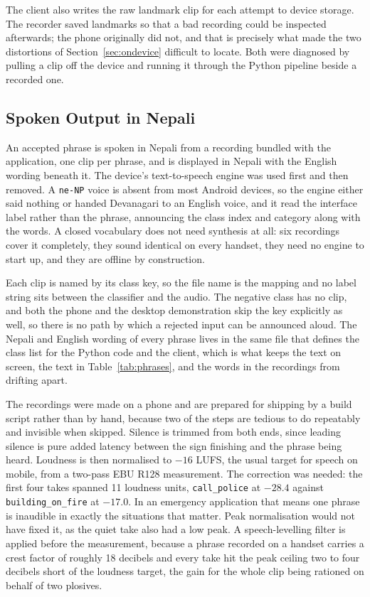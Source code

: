 The client also writes the raw landmark clip for each attempt to device storage. The recorder saved landmarks so that a bad recording could be inspected afterwards; the phone originally did not, and that is precisely what made the two distortions of Section~\ref{sec:ondevice} difficult to locate. Both were diagnosed by pulling a clip off the device and running it through the Python pipeline beside a recorded one.

\subsection{Spoken Output in Nepali}
\label{sec:audio}

An accepted phrase is spoken in Nepali from a recording bundled with the application, one clip per phrase, and is displayed in Nepali with the English wording beneath it. The device's text-to-speech engine was used first and then removed. A \texttt{ne-NP} voice is absent from most Android devices, so the engine either said nothing or handed Devanagari to an English voice, and it read the interface label rather than the phrase, announcing the class index and category along with the words. A closed vocabulary does not need synthesis at all: six recordings cover it completely, they sound identical on every handset, they need no engine to start up, and they are offline by construction.

Each clip is named by its class key, so the file name is the mapping and no label string sits between the classifier and the audio. The negative class has no clip, and both the phone and the desktop demonstration skip the key explicitly as well, so there is no path by which a rejected input can be announced aloud. The Nepali and English wording of every phrase lives in the same file that defines the class list for the Python code and the client, which is what keeps the text on screen, the text in Table~\ref{tab:phrases}, and the words in the recordings from drifting apart.

The recordings were made on a phone and are prepared for shipping by a build script rather than by hand, because two of the steps are tedious to do repeatably and invisible when skipped. Silence is trimmed from both ends, since leading silence is pure added latency between the sign finishing and the phrase being heard. Loudness is then normalised to $-16$ LUFS, the usual target for speech on mobile, from a two-pass EBU R128 measurement. The correction was needed: the first four takes spanned 11 loudness units, \texttt{call\_police} at $-28.4$ against \texttt{building\_on\_fire} at $-17.0$. In an emergency application that means one phrase is inaudible in exactly the situations that matter. Peak normalisation would not have fixed it, as the quiet take also had a low peak. A speech-levelling filter is applied before the measurement, because a phrase recorded on a handset carries a crest factor of roughly 18 decibels and every take hit the peak ceiling two to four decibels short of the loudness target, the gain for the whole clip being rationed on behalf of two plosives.

